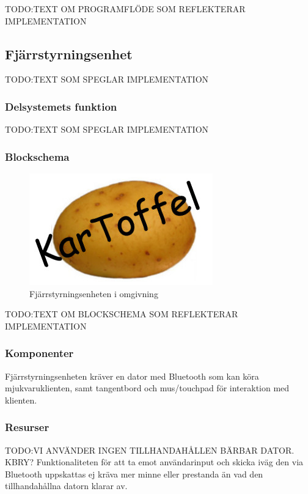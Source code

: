 \documentclass{article}
\begin{document}
TODO:TEXT OM PROGRAMFLÖDE SOM REFLEKTERAR IMPLEMENTATION

\subsection{Fjärrstyrningsenhet}
TODO:TEXT SOM SPEGLAR IMPLEMENTATION

\subsubsection{Delsystemets funktion}
TODO:TEXT SOM SPEGLAR IMPLEMENTATION

\subsubsection{Blockschema}
\begin{figure}[H]
\centering 
\includegraphics[scale=0.37]{Logo}
\caption{Fjärrstyrningsenheten i omgivning}
\label{fig:Oversikt_fjarrstyrenhet3}
\end{figure}
TODO:TEXT OM BLOCKSCHEMA SOM REFLEKTERAR IMPLEMENTATION

\subsubsection{Komponenter}
Fjärrstyrningsenheten kräver en dator med Bluetooth som kan köra mjukvaruklienten, samt tangentbord och mus/touchpad för interaktion med klienten. 

\subsubsection{Resurser}
TODO:VI ANVÄNDER INGEN TILLHANDAHÅLLEN BÄRBAR DATOR. KBRY?
Funktionaliteten för att ta emot användarinput och skicka iväg den via Bluetooth uppskattas ej kräva mer minne eller prestanda än vad den tillhandahållna datorn klarar av.
\end{document}
